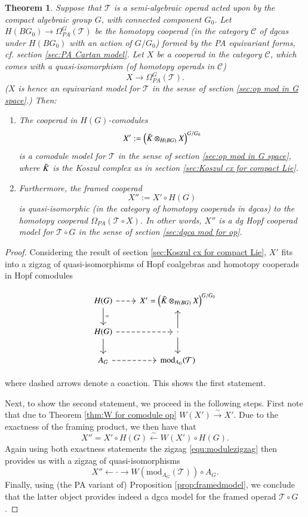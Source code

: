\documentclass[a4paper]{amsart}
\theoremstyle{plain}
\newtheorem{thm}{Theorem}
\theoremstyle{definition}
\newcommand{\op}{\mathcal}
\newcommand{\hotimes}{\mathbin{\hat\otimes}}
\renewcommand{\mod}{\mathrm{mod}}
\newcommand{\mC}{{\mathcal{C}}}
\newcommand{\beq}[1]{
\begin{equation}\label{#1}
}
\newcommand{\eeq}{
\end{equation}
}
\begin{document}
\begin{thm}\label{thm:equiv to framed}
 Suppose that $\op T$ is a semi-algebraic operad acted upon by the compact algebraic group $G$, with connected component $G_0$.
Let $H(BG_0)\to \Omega_{PA}^G(\op T)$ be the homotopy cooperad (in the category $\mC$ of dgcas under $H(BG_0)$ with an action of $G/G_0$) formed by the PA equivariant forms, cf. section \ref{sec:PA Cartan model}.
Let $X$ be a cooperad in the category $\mC$, which comes with a quasi-isomorphism (of homotopy operads in $\mC$)
\[
 X\to \Omega_{PA}^G(\op T).
\]
($X$ is hence an equivariant model for $\op T$ in the sense of section \ref{sec:op mod in G space}.)
Then:
\begin{enumerate}
 \item The cooperad in $H(G)$-comodules
$$
X' := \left(\tilde K \otimes_{H(BG)} X\right)^{G/G_0}
$$ 
is a comodule model for $\op T$ in the sense of section \ref{sec:op mod in G space}, where $\tilde K$ is the Koszul complex as in section \ref{sec:Koszul cx for compact Lie}.
\item Furthermore, the framed cooperad
$$
X'' := X' \circ H(G)
$$
is quasi-isomorphic (in the category of homotopy cooperads in dgcas) to the homotopy cooperad $\Omega_{PA}(\op T\circ X)$.
In other words, $X''$ is a dg Hopf cooperad model for $\op T\circ G$ in the sense of section \ref{sec:dgca mod for op}.
\end{enumerate}
\end{thm}
\begin{proof}
Considering the result of section \ref{sec:Koszul cx for compact Lie}, $X'$ fits into a zigzag of quasi-isomorphisms of Hopf coalgebras and homotopy cooperads in Hopf comodules
\beq{equ:modulezigzag}
\begin{tikzcd}
 H(G) \ar[dashed]{r} \ar{d}{=} & X'=\left(\HK \otimes_{H(BG)} X\right)^{G/G_0} \\
 H(G) \ar[dashed]{r} \ar{d} & \cdot \ar{u} \ar{d} \\
A_G \ar[dashed]{r} & \mod_{A_G}(\op T) %
\end{tikzcd}
\eeq
where dashed arrows denote a coaction. This shows the first statement.


Next, to show the second statement, we proceed in the following steps.
First note that due to Theorem \ref{thm:W for comodule op} $W(X')\xrightarrow{\sim} X'$. Due to the exactness of the framing product, we then have that
\[
 X'' = X'\circ H(G) \xleftarrow{\sim} W(X') \circ H(G).
\]
Again using both exactness statements the zigzag \ref{equ:modulezigzag} then provides us with a zigzag of quasi-isomorphisms
\[
 X'' \leftarrow \cdot \rightarrow W(\mod_{A_G}(\op T))\circ A_G.
\]
Finally, using (the PA variant of) Proposition \ref{prop:framedmodel}, we conclude that the latter object provides indeed a dgca model for the framed operad $\op T\circ G$.
\end{proof}
\end{document}
